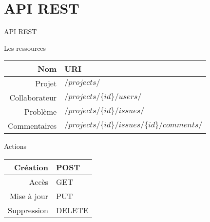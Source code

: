 \section{API REST}

\begin{frame}{API REST}
  \begin{block}{Les ressources}
    \begin{center}
      \begin{tabular}{|r|l|}
        \hline
        Nom & URI \\
        \hline
        \hline
        Projet & $/projects/$ \\
        Collaborateur & $/projects/\{id\}/users/$ \\
        Problème & $/projects/\{id\}/issues/$ \\
        Commentaires & $/projects/\{id\}/issues/\{id\}/comments/$ \\
        \hline
      \end{tabular}
    \end{center}
  \end{block}

  \begin{block}{Actions}
    \begin{center}
      \begin{tabular}{|r|l|}
        \hline
        Création & POST \\
        \hline
        Accès & GET \\
        \hline
        Mise à jour & PUT \\
        \hline
        Suppression & DELETE \\
        \hline
      \end{tabular}
    \end{center}
  \end{block}
\end{frame}
